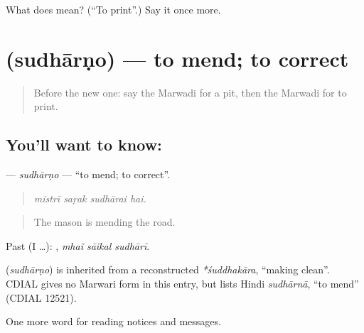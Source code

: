 \begin{tcolorbox}[breakable,colback=teal!4,colframe=teal!35!black,title={Before you move on}]
What does  mean? (\textquotedblleft{}To print\textquotedblright{}.) Say it once more.
\end{tcolorbox}
\section[\texorpdfstring{\mw{सुधारणो} (sudhārṇo)}{सुधारणो (sudhārṇo)}]{ (sudhārṇo) — to mend; to correct}

\label{lesson:MW-C192-sudharno}



\begin{quote}
Before the new one: say the Marwadi for a pit, then the Marwadi for to print.
\end{quote}

\subsection*{You'll want to know: }
\textbf{} — \emph{sudhārṇo} — \textquotedblleft{}to mend; to correct\textquotedblright{}.

\begin{quote}
   
\end{quote}

\begin{quote}
\emph{mistrī saṛak sudhārai hai.}
\end{quote}

\begin{quote}
The mason is mending the road.
\end{quote}

Past (I …):   , \emph{mhaĩ sāikal sudhārī}.

\begin{cousinweb}
\textbf{} (\emph{sudhārṇo}) is inherited from a reconstructed \emph{*śuddhakāra}, \textquotedblleft{}making clean\textquotedblright{}. CDIAL gives no Marwari form in this entry, but lists Hindi \emph{sudhārnā}, \textquotedblleft{}to mend\textquotedblright{} (CDIAL 12521).
\end{cousinweb}

\begin{grammarlens}[title={What you've built}]
One more word for reading notices and messages.
\end{grammarlens}


